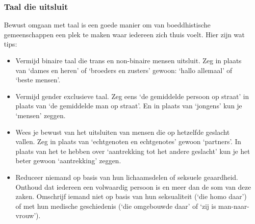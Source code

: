 \documentclass[12pt,openany]{book}
\begin{document}
\subsubsection*{Taal die uitsluit}

Bewust omgaan met taal is een goede manier om van boeddhistische gemeenschappen een plek te maken waar iedereen zich thuis voelt.  Hier zijn wat tips:

\begin{itemize}
  \setlength\itemsep{-0.3em}
  \item Vermijd binaire taal die trans en non-binaire mensen uitsluit. Zeg in plaats van `dames en heren' of `broeders en zusters' gewoon: `hallo allemaal' of `beste mensen'.
  \item Vermijd gender exclusieve taal. Zeg eens `de gemiddelde persoon op straat' in plaats van `de gemiddelde man op straat'. En in plaats van `jongens' kun je `mensen' zeggen.
  \item Wees je bewust van het uitsluiten van mensen die op hetzelfde geslacht vallen. Zeg in plaats van `echtgenoten en echtgenotes' gewoon `partners'. In plaats van het te hebben over `aantrekking tot het andere geslacht' kun je het beter gewoon `aantrekking' zeggen.
\item Reduceer niemand op basis van hun lichaamsdelen of seksuele geaardheid. Onthoud dat iedereen een volwaardig persoon is en meer dan de som van deze zaken. Omschrijf iemand niet op basis van hun seksualiteit (`die homo daar') of met hun medische geschiedenis (`die omgebouwde daar' of `zij is man-naar-vrouw').
\end{itemize}


\begin{figure}[h]
    \centering
\end{figure}
\end{document}

